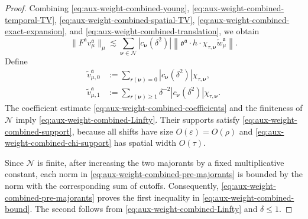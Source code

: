 \documentclass{article}
\numberwithin{equation}{section}
\newcommand{\assign}{:=}
\theoremstyle{plain}
\theoremstyle{definition}
\begin{document}
\begin{proof}
	Combining \eqref{eq:aux-weight-combined-young},
	\eqref{eq:aux-weight-combined-temporal-TV},
	\eqref{eq:aux-weight-combined-spatial-TV},
	\eqref{eq:aux-weight-combined-exact-expansion}, and
	\eqref{eq:aux-weight-combined-translation}, we obtain
	\begin{equation}
		\label{eq:aux-weight-combined-pre-majorants}
		\|F^{\mathfrak a}v_\mu^{\mathfrak a}\|_\mu
		\lesssim
		\sum_{\boldsymbol\nu\in\mathcal N}
		|c_{\boldsymbol\nu}(\delta^2)|
		\left\|
		\mathfrak o^{\mathfrak a}\cdot h\cdot
		\chi_{\tau,\boldsymbol\nu}
		\tilde w_\mu^{\mathfrak a}
		\right\|.
	\end{equation}
	Define
	\begin{align*}
		\tilde v_{\mu,0}^{\mathfrak a}
		&\assign
		\sum_{r(\boldsymbol\nu)=0}
		|c_{\boldsymbol\nu}(\delta^2)|
		\chi_{\tau,\boldsymbol\nu},
		\\
		\tilde v_{\mu,1}^{\mathfrak a}
		&\assign
		\sum_{r(\boldsymbol\nu)\geqslant1}
		\delta^{-2}
		|c_{\boldsymbol\nu}(\delta^2)|
		\chi_{\tau,\boldsymbol\nu}.
	\end{align*}
	The coefficient estimate
	\eqref{eq:aux-weight-combined-coefficients} and the finiteness of
	$\mathcal N$ imply \eqref{eq:aux-weight-combined-Linfty}. Their supports
	satisfy \eqref{eq:aux-weight-combined-support}, because all shifts have
	size $O(\varepsilon)=O(\rho)$ and
	\eqref{eq:aux-weight-combined-chi-support} has spatial width $O(\tau)$.
	
	Since $\mathcal N$ is finite, after increasing the two majorants by a
	fixed multiplicative constant, each norm in
	\eqref{eq:aux-weight-combined-pre-majorants} is bounded by the norm with
	the corresponding sum of cutoffs. Consequently,
	\eqref{eq:aux-weight-combined-pre-majorants} proves the first inequality
	in \eqref{eq:aux-weight-combined-bound}. The second follows from
	\eqref{eq:aux-weight-combined-Linfty} and $\delta\leqslant1$.
	

\end{proof}
\end{document}
